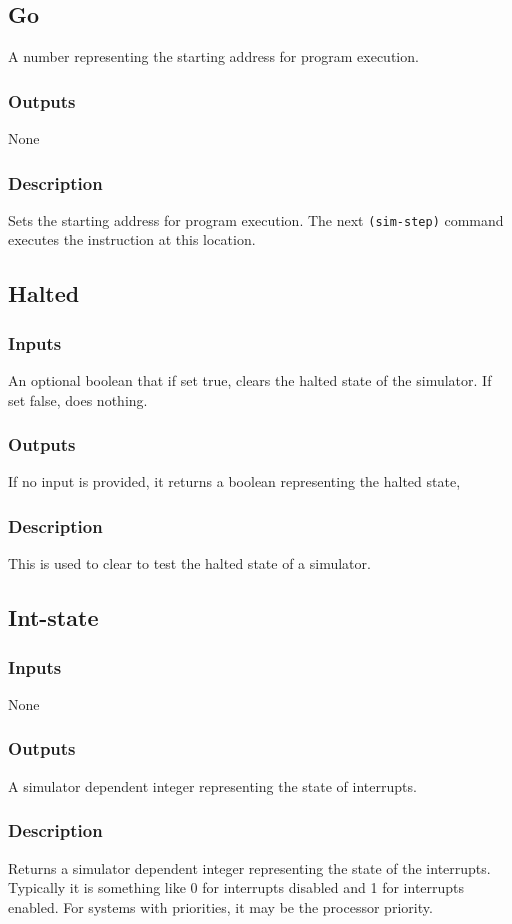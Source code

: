 \documentclass[10pt, openany]{book}
\begin{document}
\subsection{Go}
A number representing the starting address for program execution.
\subsubsection{Outputs}
None
\subsubsection{Description}
Sets the starting address for program execution.  The next \verb|(sim-step)| command executes the instruction at this location.

\subsection{Halted}
\subsubsection{Inputs}
An optional boolean that if set true, clears the halted state of the simulator.  If set false, does nothing.
\subsubsection{Outputs}
If no input is provided, it returns a boolean representing the halted state, 
\subsubsection{Description}
This is used to clear to test the halted state of a simulator.

\subsection{Int-state}
\subsubsection{Inputs}
None
\subsubsection{Outputs}
A simulator dependent integer representing the state of interrupts.
\subsubsection{Description}
Returns a simulator dependent integer representing the state of the interrupts.  Typically it is something like 0 for interrupts disabled and 1 for interrupts enabled.  For systems with priorities, it may be the processor priority.
\end{document}
